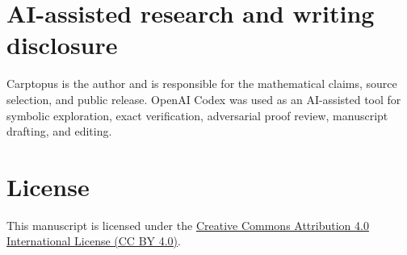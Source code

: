 \documentclass[11pt]{article}
\begin{document}
\begin{enumerate}
\end{enumerate}

\section*{AI-assisted research and writing disclosure}


Carptopus is the author and is responsible for the mathematical claims, source selection, and
public release. OpenAI Codex was used as an AI-assisted tool for symbolic exploration, exact
verification, adversarial proof review, manuscript drafting, and editing.

\section*{License}


This manuscript is licensed under the \href{https://creativecommons.org/licenses/by/4.0/}{Creative Commons Attribution 4.0 International License (CC BY 4.0)}.
\end{document}
